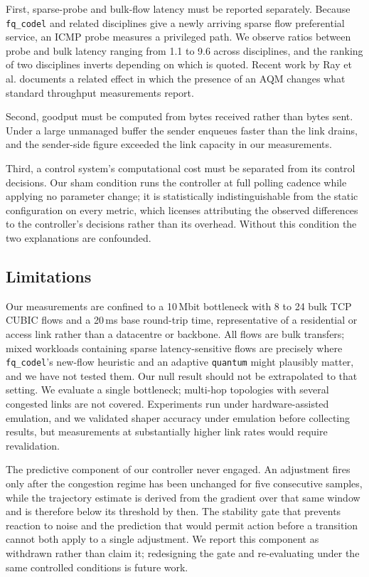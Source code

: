 First, sparse-probe and bulk-flow latency must be reported separately. Because
\texttt{fq\_codel} and related disciplines give a newly arriving sparse flow
preferential service, an ICMP probe measures a privileged path. We observe
ratios between probe and bulk latency ranging from 1.1 to 9.6 across
disciplines, and the ranking of two disciplines inverts depending on which is
quoted. Recent work by Ray et al.\cite{ray2025} documents a related effect in
which the presence of an AQM changes what standard throughput measurements
report.

Second, goodput must be computed from bytes received rather than bytes sent.
Under a large unmanaged buffer the sender enqueues faster than the link drains,
and the sender-side figure exceeded the link capacity in our measurements.

Third, a control system's computational cost must be separated from its control
decisions. Our sham condition runs the controller at full polling cadence while
applying no parameter change; it is statistically indistinguishable from the
static configuration on every metric, which licenses attributing the observed
differences to the controller's decisions rather than its overhead. Without
this condition the two explanations are confounded.

\subsection*{Limitations}

Our measurements are confined to a 10\,Mbit bottleneck with 8 to 24 bulk TCP
CUBIC\cite{cubic2008} flows and a 20\,ms base round-trip time, representative
of a residential or access link rather than a datacentre or backbone. All flows
are bulk transfers; mixed workloads containing sparse latency-sensitive flows
are precisely where \texttt{fq\_codel}'s new-flow heuristic and an adaptive
\texttt{quantum} might plausibly matter, and we have not tested them. Our null
result should not be extrapolated to that setting. We evaluate a single
bottleneck; multi-hop topologies with several congested links are not covered.
Experiments run under hardware-assisted emulation, and we validated shaper
accuracy under emulation before collecting results, but measurements at
substantially higher link rates would require revalidation.

The predictive component of our controller never engaged. An adjustment fires
only after the congestion regime has been unchanged for five consecutive
samples, while the trajectory estimate is derived from the gradient over that
same window and is therefore below its threshold by then. The stability gate
that prevents reaction to noise and the prediction that would permit action
before a transition cannot both apply to a single adjustment. We report this
component as withdrawn rather than claim it; redesigning the gate and
re-evaluating under the same controlled conditions is future work.

